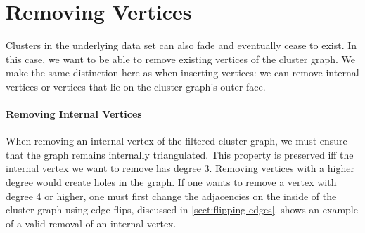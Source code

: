 \section{Removing Vertices}
\label{sect:removing-vertices}

Clusters in the underlying data set can also fade and eventually cease to exist.
In this case, we want to be able to remove existing vertices of the cluster graph.
We make the same distinction here as when inserting vertices: we can remove internal vertices or vertices that lie on the cluster graph's outer face.




\paragraph{Removing Internal Vertices}

When removing an internal vertex of the filtered cluster graph, we must ensure that the graph remains internally triangulated.
This property is preserved iff the internal vertex we want to remove has degree 3.
Removing vertices with a higher degree would create holes in the graph.
If one wants to remove a vertex with degree 4 or higher, one must first change the adjacencies on the inside of the cluster graph using edge flips, discussed in \cref{sect:flipping-edges}.
 shows an example of a valid removal of an internal vertex.

